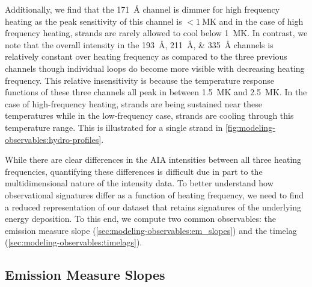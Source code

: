 Additionally, we find that the \SI{171}{\angstrom} channel is dimmer for high frequency heating as the peak sensitivity of this channel is $<\SI{1}{\mega\kelvin}$ and in the case of high frequency heating, strands are rarely allowed to cool below \SI{1}{\mega\kelvin}. In contrast, we note that the overall intensity in the \SIlist{193;211;335}{\angstrom} channels is relatively constant over heating frequency as compared to the three previous channels though individual loops do become more visible with decreasing heating frequency. This relative insensitivity is because the temperature response functions of these three channels all peak in between \SI{1.5}{\mega\kelvin} and \SI{2.5}{\mega\kelvin}. In the case of high-frequency heating, strands are being sustained near these temperatures while in the low-frequency case, strands are cooling through this temperature range. This is illustrated for a single strand in \autoref{fig:modeling-observables:hydro-profiles}.

While there are clear differences in the AIA intensities between all three heating frequencies, quantifying these differences is difficult due in part to the multidimensional nature of the intensity data. To better understand how observational signatures differ as a function of heating frequency, we need to find a reduced representation of our dataset that retains signatures of the underlying energy deposition. To this end, we compute two common observables: the emission measure slope (\autoref{sec:modeling-observables:em_slopes}) and the timelag (\autoref{sec:modeling-observables:timelags}).

\subsection{Emission Measure Slopes}\label{sec:modeling-observables:em_slopes}

